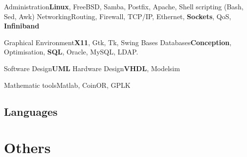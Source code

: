 \documentclass[10pt,a4paper]{moderncv}
\begin{document}
\cvcomputer
{Administration}{\textbf{Linux}, FreeBSD, Samba, Postfix, Apache, Shell scripting (Bash, Sed, Awk)}
{Networking}{Routing, Firewall, TCP/IP, Ethernet, \textbf{Sockets}, QoS, \textbf{Infiniband}}

\cvcomputer
{Graphical Environment}{\textbf{X11}, Gtk, Tk, Swing}
{Bases Databases}{\textbf{Conception}, Optimisation, \textbf{SQL}, Oracle, MySQL, LDAP.}

\cvcomputer
{Software Design}{\textbf{UML}}
{Hardware Design}{\textbf{VHDL}, Modelsim}

\cvcomputer
{Mathematic tools}{Matlab, CoinOR, GPLK}{}{}

\subsection{Languages}

\section{Others}
\end{document}
